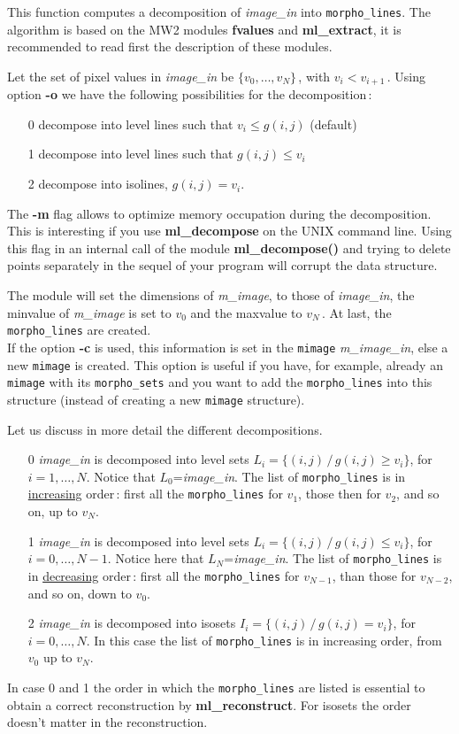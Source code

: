 This function computes a decomposition of {\em image\_in}
into {\tt morpho\_lines}. The algorithm is based on the
MW2 modules {\bf fvalues} and {\bf ml\_extract}, it is recommended
to read first the description of these modules.

\medskip

Let the set of pixel values in {\em image\_in} be 
$\{v_0,\ldots,v_N\}$\,, with $v_i<v_{i+1}$\,.
Using option {\bf -o} we have the following possibilities
for the decomposition\,:
\begin{itemize}
\item[ 0 ] decompose into level lines such that $v_i\leq g(i,j)$
  (default)
\item[ 1 ] decompose into level lines such that $g(i,j)\leq v_i$
\item[ 2 ] decompose into isolines, $g(i,j)= v_i$. 
\end{itemize}

The {\bf -m} flag allows to optimize memory occupation during
the decomposition. This is interesting if you use {\bf ml\_decompose}
on the UNIX command line. Using this flag in an internal call
of the module {\bf ml\_decompose()} and trying to delete
points separately in the sequel of your program will corrupt
the data structure.

The module will set the dimensions of {\em m\_image}, to those
of {\em image\_in}, the minvalue of {\em m\_image} is set to $v_0$ 
and the maxvalue to $v_N$\,. At last, the {\tt morpho\_lines}
are created.\\
If the option {\bf -c} is used, this information is set in the
{\tt mimage} {\em m\_image\_in}, else a new {\tt mimage} is created.
This option is useful if you have, for example, already an {\tt mimage}
with its {\tt morpho\_sets} and you want to add the {\tt morpho\_lines}
into this structure (instead of creating a new {\tt mimage} structure).

\bigskip 

Let us discuss in more detail the different decompositions.
\begin{itemize}

\item[ 0 ] {\em image\_in} is decomposed into level sets
$L_i=\{ (i,j)\,/\, g(i,j)\geq v_i\}$, for $i=1,\ldots,N$.
Notice that $L_0$={\em image\_in}. The list of {\tt morpho\_lines}
is in \underline{increasing} order\,: 
first all the {\tt morpho\_lines} for $v_1$,
those then for $v_2$, and so on, up to $v_N$.

\item[ 1 ] {\em image\_in} is decomposed into level sets
$L_i=\{ (i,j)\,/\, g(i,j)\leq v_i\}$, for $i=0,\ldots,N-1$.
Notice here that $L_N$={\em image\_in}. The list of {\tt morpho\_lines}
is in \underline{decreasing} order\,: 
first all the {\tt morpho\_lines} 
for $v_{N-1}$, than those for $v_{N-2}$, 
and so on, down to $v_0$.

\item[ 2 ] {\em image\_in} is decomposed into isosets
$I_i=\{ (i,j)\,/\, g(i,j)= v_i\}$, for $i=0,\ldots,N$.
In this case the list of {\tt morpho\_lines} is in increasing order,
from $v_0$ up to $v_N$.

\end{itemize}

In case 0 and 1 the order in which the {\tt morpho\_lines} are listed
is essential to obtain a correct reconstruction by {\bf ml\_reconstruct}.
For isosets the order doesn't matter in the reconstruction.